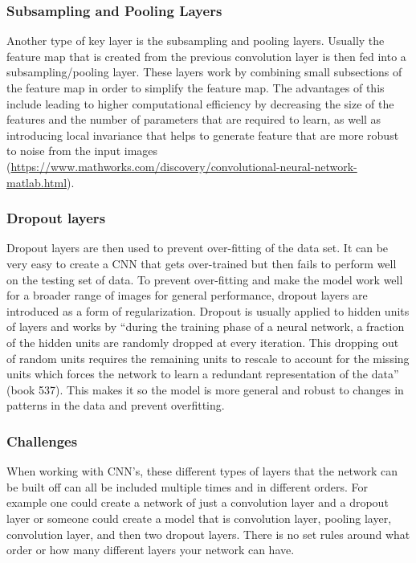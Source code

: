 \documentclass[12pt]{article}
\begin{document}
\hypertarget{subsampling-and-pooling-layers}{%
\subsubsection{Subsampling and Pooling
Layers}\label{subsampling-and-pooling-layers}}

Another type of key layer is the subsampling and pooling layers. Usually
the feature map that is created from the previous convolution layer is
then fed into a subsampling/pooling layer. These layers work by
combining small subsections of the feature map in order to simplify the
feature map. The advantages of this include leading to higher
computational efficiency by decreasing the size of the features and the
number of parameters that are required to learn, as well as introducing
local invariance that helps to generate feature that are more robust to
noise from the input images
(\url{https://www.mathworks.com/discovery/convolutional-neural-network-matlab.html}).

\hypertarget{dropout-layers}{%
\subsubsection{Dropout layers}\label{dropout-layers}}

Dropout layers are then used to prevent over-fitting of the data set. It
can be very easy to create a CNN that gets over-trained but then fails
to perform well on the testing set of data. To prevent over-fitting and
make the model work well for a broader range of images for general
performance, dropout layers are introduced as a form of regularization.
Dropout is usually applied to hidden units of layers and works by
``during the training phase of a neural network, a fraction of the
hidden units are randomly dropped at every iteration. This dropping out
of random units requires the remaining units to rescale to account for
the missing units which forces the network to learn a redundant
representation of the data'' (book 537). This makes it so the model is
more general and robust to changes in patterns in the data and prevent
overfitting.

\hypertarget{challenges}{%
\subsubsection{Challenges}\label{challenges}}

When working with CNN's, these different types of layers that the
network can be built off can all be included multiple times and in
different orders. For example one could create a network of just a
convolution layer and a dropout layer or someone could create a model
that is convolution layer, pooling layer, convolution layer, and then
two dropout layers. There is no set rules around what order or how many
different layers your network can have.
\end{document}
